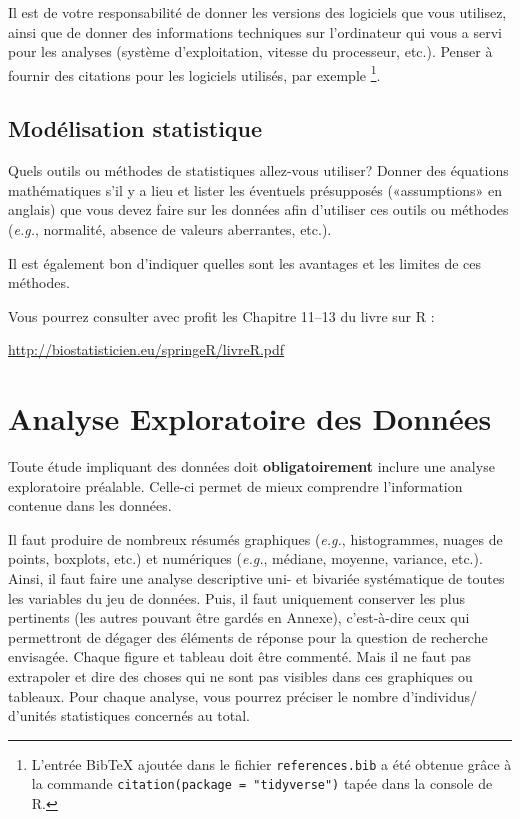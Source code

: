 \documentclass[mstat,12pt]{unswthesis}
\begin{document}
\bigskip

Il est de votre responsabilité de donner les versions des logiciels que
vous utilisez, ainsi que de donner des informations techniques sur
l'ordinateur qui vous a servi pour les analyses (système d'exploitation,
vitesse du processeur, etc.). Penser à fournir des citations pour les
logiciels utilisés, par exemple
\footnote{L'entrée BibTeX ajoutée dans le fichier \texttt{references.bib} a été obtenue grâce à la commande  \texttt{citation(package = "tidyverse")} tapée dans la console de R.}.

\section{Modélisation statistique}\label{moduxe9lisation-statistique}

Quels outils ou méthodes de statistiques allez-vous utiliser? Donner des
équations mathématiques s'il y a lieu et lister les éventuels
présupposés («assumptions» en anglais) que vous devez faire sur les
données afin d'utiliser ces outils ou méthodes (\emph{e.g.}, normalité,
absence de valeurs aberrantes, etc.).

Il est également bon d'indiquer quelles sont les avantages et les
limites de ces méthodes.

Vous pourrez consulter avec profit les Chapitre 11--13 du livre sur R :

\url{http://biostatisticien.eu/springeR/livreR.pdf}

\chapter{Analyse Exploratoire des
Données}\label{analyse-exploratoire-des-donnuxe9es}

Toute étude impliquant des données doit \textbf{obligatoirement} inclure
une analyse exploratoire préalable. Celle-ci permet de mieux comprendre
l'information contenue dans les données.

Il faut produire de nombreux résumés graphiques (\emph{e.g.},
histogrammes, nuages de points, boxplots, etc.) et numériques
(\emph{e.g.}, médiane, moyenne, variance, etc.). Ainsi, il faut faire
une analyse descriptive uni- et bivariée systématique de toutes les
variables du jeu de données. Puis, il faut uniquement conserver les plus
pertinents (les autres pouvant être gardés en Annexe), c'est-à-dire ceux
qui permettront de dégager des éléments de réponse pour la question de
recherche envisagée. Chaque figure et tableau doit être commenté. Mais
il ne faut pas extrapoler et dire des choses qui ne sont pas visibles
dans ces graphiques ou tableaux. Pour chaque analyse, vous pourrez
préciser le nombre d'individus/ d'unités statistiques concernés au
total.
\end{document}
